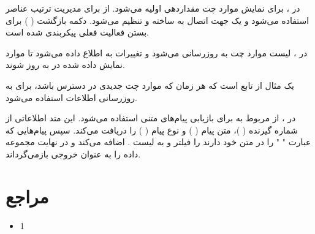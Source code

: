 \documentclass{report}
\begin{document}
در
 ، 
  برای نمایش موارد چت مقداردهی اولیه می‌شود. از
    برای مدیریت ترتیب عناصر استفاده می‌شود و یک 
   جهت اتصال به 
    ساخته و تنظیم می‌شود. دکمه بازگشت (
    ) برای بستن فعالیت فعلی پیکربندی شده است.

در 
، لیست موارد چت به روزرسانی می‌شود و تغییرات به
 اطلاع داده می‌شود تا موارد نمایش داده شده در 
  به روز شوند.

 یک مثال از تابع
است که هر زمان که موارد چت جدیدی در دسترس باشد، برای به روزرسانی اطلاعات استفاده می‌شود.

در
 ، از 
  مربوط به 
   برای بازیابی پیام‌های متنی استفاده می‌شود. این متد اطلاعاتی از شماره گیرنده 
   (
   )، متن پیام (
   ) 
   و نوع پیام (
   ) را دریافت می‌کند. سپس پیام‌هایی که عبارت "
   " را در متن خود دارند را فیلتر و به لیست
   .
    اضافه می‌کند و در نهایت مجموعه داده را به عنوان خروجی بازمی‌گرداند.
\chapter {مراجع}
\begin{itemize}
	\item 1
\end{itemize}
\end{document}
